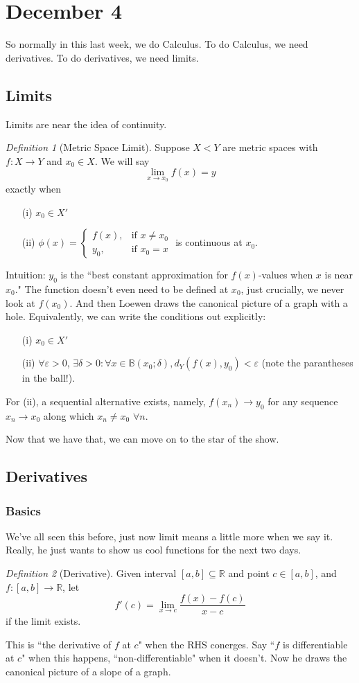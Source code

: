 \documentclass{article}
\theoremstyle{plain}
\theoremstyle{remark}
\newtheorem{definition}{Definition}
\newcommand{\R}{{\mathbb R}}
\newcommand{\ep}{{\varepsilon}}
\begin{document}
\section{December 4}
So normally in this last week, we do Calculus.
To do Calculus, we need derivatives.
To do derivatives, we need limits.

\subsection{Limits}
Limits are near the idea of continuity.
\begin{definition}[Metric Space Limit]
	Suppose $X<Y$ are metric spaces with $f \colon X \to Y$ and $x_0 \in X$.
	We will say
	\[
		\lim_{x \to x_0} f(x) = y
	\]
	exactly when
	\begin{enumerate}
		\item[(i)] $x_0 \in X'$
		\item[(ii)] $\phi(x) = \begin{cases} f(x), &\text{if }x\neq x_0\\
			y_0, &\text{if }x_0=x\end{cases}$
			is continuous at $x_0$.
	\end{enumerate}
\end{definition}
Intuition: $y_0$ is the ``best constant approximation for $f(x)$-values when $x$ is near $x_0$."
The function doesn't even need to be defined at $x_0$,
just crucially, we never look at $f(x_0)$.
And then Loewen draws the canonical picture of a graph with a hole.
Equivalently, we can write the conditions out explicitly:
\begin{enumerate}
	\item[(i)] $x_0 \in X'$
	\item[(ii)] $\forall \ep > 0$, $\exists \delta > 0 \colon
		\forall x \in \mathbb{B}(x_0;\delta), d_Y(f(x),y_0) < \ep$
		(note the parantheses in the ball!).
\end{enumerate}
For (ii),  a sequential alternative exists, namely,
$f(x_n) \to y_0$ for any sequence $x_n \to x_0$ along which $x_n \neq x_0$ $\forall n$.

Now that we have that, we can move on to the star of the show.

\subsection{Derivatives}
\subsubsection{Basics}
We've all seen this before, just now limit means a little more when we say it.
Really, he just wants to show us cool functions for the next two days.
\begin{definition}[Derivative]
	Given interval $[a,b] \subseteq \R$ and point $c \in [a,b]$,
	and $f \colon [a,b] \to \R$, let
	\[
		f'(c) = \lim_{x \to c}\frac{f(x)-f(c)}{x-c}
	\]
	if the limit exists.
\end{definition}
This is ``the derivative of $f$ at $c$" when the RHS conerges.
Say ``$f$ is differentiable at $c$" when this happens,
``non-differentiable" when it doesn't.
Now he draws the canonical picture of a slope of a graph.
\end{document}
